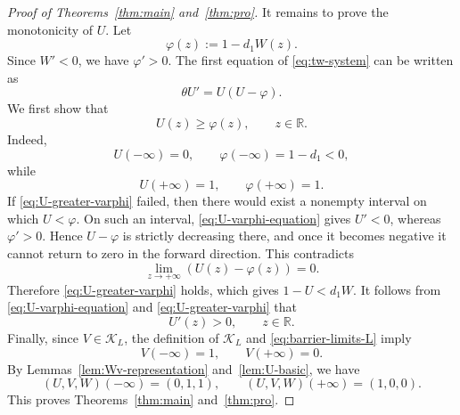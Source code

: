 \documentclass[preprint,sort&compress,final,12pt]{elsarticle}
\numberwithin{equation}{section}
\begin{document}
\begin{proof}[Proof of Theorems~\ref{thm:main} and~\ref{thm:pro}]
It remains to prove the monotonicity of $U$. Let
\begin{equation*}
\varphi(z):=1-d_1W(z).
\end{equation*}
Since $W'<0$, we have $\varphi'>0$. The first equation of \eqref{eq:tw-system} can be written as
\begin{equation}\label{eq:U-varphi-equation}
\theta U'=U(U-\varphi).
\end{equation}
We first show that
\begin{equation}\label{eq:U-greater-varphi}
U(z)\ge\varphi(z),\qquad z\in\mathbb R.
\end{equation}
Indeed,
\begin{equation*}
U(-\infty)=0,\qquad \varphi(-\infty)=1-d_1<0,
\end{equation*}
while
\begin{equation*}
U(+\infty)=1,\qquad \varphi(+\infty)=1.
\end{equation*}
If \eqref{eq:U-greater-varphi} failed, then there would exist a nonempty interval on which $U<\varphi$. On such an interval, \eqref{eq:U-varphi-equation} gives $U'<0$, whereas $\varphi'>0$. Hence $U-\varphi$ is strictly decreasing there, and once it becomes negative it cannot return to zero in the forward direction. This contradicts
\begin{equation*}
\lim_{z\to+\infty}(U(z)-\varphi(z))=0.
\end{equation*}
Therefore \eqref{eq:U-greater-varphi} holds, which gives $1-U<d_1W$.
It follows from \eqref{eq:U-varphi-equation} and \eqref{eq:U-greater-varphi} that
\begin{equation*}
U'(z)>0,\qquad z\in\mathbb R.
\end{equation*}
Finally, since $V\in\mathcal K_L$, the definition of $\mathcal K_L$ and \eqref{eq:barrier-limits-L} imply
\begin{equation*}
V(-\infty)=1,\qquad V(+\infty)=0.
\end{equation*}
By Lemmas~\ref{lem:Wv-representation} and~\ref{lem:U-basic}, we have
\begin{equation*}
(U,V,W)(-\infty)=(0,1,1),\qquad
(U,V,W)(+\infty)=(1,0,0).
\end{equation*}
This proves Theorems~\ref{thm:main} and~\ref{thm:pro}.
\end{proof}
\end{document}
